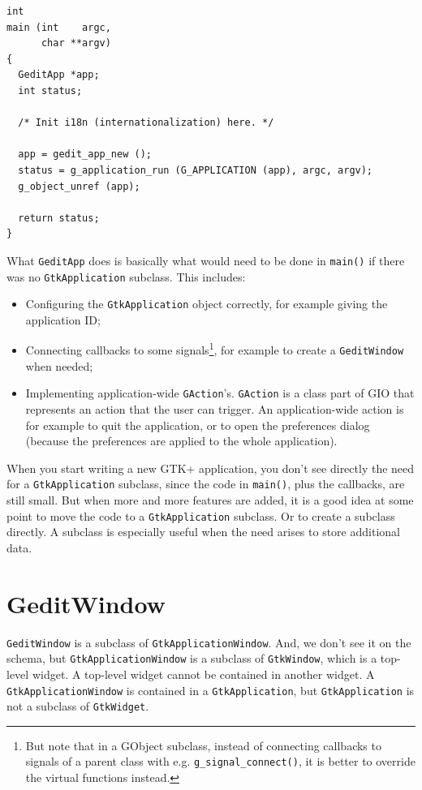 \begin{lstlisting}
int
main (int    argc,
      char **argv)
{
  GeditApp *app;
  int status;

  /* Init i18n (internationalization) here. */

  app = gedit_app_new ();
  status = g_application_run (G_APPLICATION (app), argc, argv);
  g_object_unref (app);

  return status;
}
\end{lstlisting}

What \lstinline{GeditApp} does is basically what would need to be done in \lstinline{main()} if there was no \lstinline{GtkApplication} subclass. This includes:
\begin{itemize}
  \item Configuring the \lstinline{GtkApplication} object correctly, for example giving the application ID;
  \item Connecting callbacks to some signals\footnote{But note that in a GObject subclass, instead of connecting callbacks to signals of a parent class with e.g. \lstinline{g_signal_connect()}, it is better to override the virtual functions instead.}, for example to create a \lstinline{GeditWindow} when needed;
  \item Implementing application-wide \lstinline{GAction}'s. \lstinline{GAction} is a class part of GIO that represents an action that the user can trigger. An application-wide action is for example to quit the application, or to open the preferences dialog (because the preferences are applied to the whole application).
\end{itemize}

When you start writing a new GTK+ application, you don't see directly the need for a \lstinline{GtkApplication} subclass, since the code in \lstinline{main()}, plus the callbacks, are still small. But when more and more features are added, it is a good idea at some point to move the code to a \lstinline{GtkApplication} subclass. Or to create a subclass directly. A subclass is especially useful when the need arises to store additional data.

\section{GeditWindow}

\lstinline{GeditWindow} is a subclass of \lstinline{GtkApplicationWindow}. And, we don't see it on the schema, but \lstinline{GtkApplicationWindow} is a subclass of \lstinline{GtkWindow}, which is a top-level widget. A top-level widget cannot be contained in another widget. A \lstinline{GtkApplicationWindow} is contained in a \lstinline{GtkApplication}, but \lstinline{GtkApplication} is not a subclass of \lstinline{GtkWidget}.

